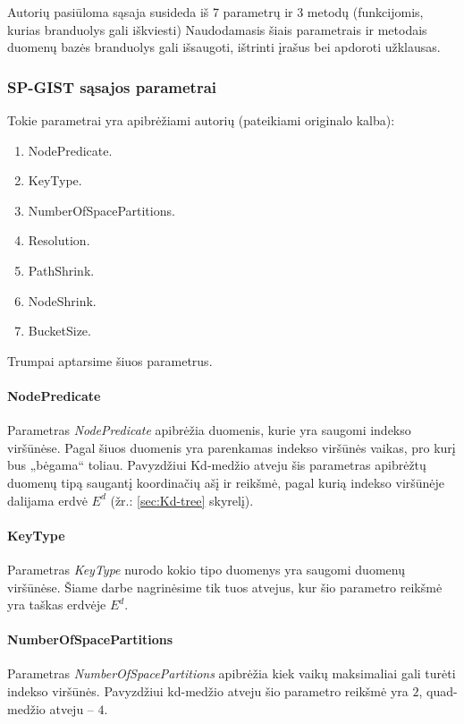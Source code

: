 Autorių pasiūloma sąsaja susideda iš 7 parametrų ir 3 metodų (funkcijomis, kurias branduolys gali iškviesti)
Naudodamasis šiais parametrais ir metodais duomenų bazės branduolys gali išsaugoti, ištrinti įrašus bei apdoroti užklausas.

\subsubsection{SP-GIST sąsajos parametrai}
Tokie parametrai yra apibrėžiami autorių (pateikiami originalo kalba):
\begin{enumerate}
	\item NodePredicate.
	\item KeyType.
	\item NumberOfSpacePartitions.
	\item Resolution.
	\item PathShrink.
	\item NodeShrink.
	\item BucketSize.
\end{enumerate}

Trumpai aptarsime šiuos parametrus.

\paragraph{NodePredicate}
Parametras {\it NodePredicate} apibrėžia duomenis, kurie yra saugomi indekso viršūnėse.
Pagal šiuos duomenis yra parenkamas indekso viršūnės vaikas, pro kurį bus „bėgama“ toliau.
Pavyzdžiui Kd-medžio atveju šis parametras apibrėžtų duomenų tipą saugantį koordinačių ašį ir reikšmė, pagal kurią indekso viršūnėje dalijama erdvė $E^d$ (žr.: \ref{sec:Kd-tree} skyrelį).

\paragraph{KeyType}
Parametras {\it KeyType} nurodo kokio tipo duomenys yra saugomi duomenų viršūnėse.
Šiame darbe nagrinėsime tik tuos atvejus, kur šio parametro reikšmė yra taškas erdvėje $E^d$.

\paragraph{NumberOfSpacePartitions}
Parametras {\it NumberOfSpacePartitions} apibrėžia kiek vaikų maksimaliai gali turėti indekso viršūnės.
Pavyzdžiui kd-medžio atveju šio parametro reikšmė yra $2$, quad-medžio atveju -- $4$.

